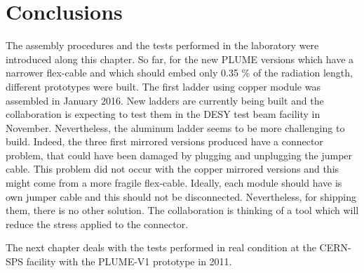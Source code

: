 \section{Conclusions}

  The assembly procedures and the tests performed in the laboratory were introduced along this chapter.
  So far, for the new PLUME versions which have a narrower flex-cable and which should embed only 0.35 \% of the radiation length, different prototypes were built. 
  The first ladder using copper module was assembled in January 2016.
  New ladders are currently being built and the collaboration is expecting to test them in the DESY test beam facility in November.
  Nevertheless, the aluminum ladder seems to be more challenging to build.
  Indeed, the three first mirrored versions produced have a connector problem, that could have been damaged by plugging and unplugging the jumper cable.
  This problem did not occur with the copper mirrored versions and this might come from a more fragile flex-cable.
  Ideally, each module should have is own jumper cable and this should not be disconnected.
  Nevertheless, for shipping them, there is no other solution.
  The collaboration is thinking of a tool which will reduce the stress applied to the connector.

  The next chapter deals with the tests performed in real condition at the CERN-SPS facility with the PLUME-V1 prototype in 2011.


